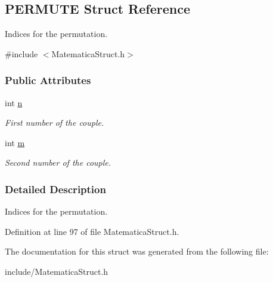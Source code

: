 \hypertarget{structPERMUTE}{}\subsection{P\+E\+R\+M\+U\+TE Struct Reference}
\label{structPERMUTE}


Indices for the permutation.  




{\ttfamily \#include $<$Matematica\+Struct.\+h$>$}

\subsubsection*{Public Attributes}
\begin{DoxyCompactItemize}
\item 
int \hyperlink{structPERMUTE_a76f11d9a0a47b94f72c2d0e77fb32240}{n}\hypertarget{structPERMUTE_a76f11d9a0a47b94f72c2d0e77fb32240}{}\label{structPERMUTE_a76f11d9a0a47b94f72c2d0e77fb32240}

\begin{DoxyCompactList}\small\item\em First number of the couple. \end{DoxyCompactList}\item 
int \hyperlink{structPERMUTE_a742204794ea328ba293fe59cec79b990}{m}\hypertarget{structPERMUTE_a742204794ea328ba293fe59cec79b990}{}\label{structPERMUTE_a742204794ea328ba293fe59cec79b990}

\begin{DoxyCompactList}\small\item\em Second number of the couple. \end{DoxyCompactList}\end{DoxyCompactItemize}


\subsubsection{Detailed Description}
Indices for the permutation. 

Definition at line 97 of file Matematica\+Struct.\+h.



The documentation for this struct was generated from the following file\+:\begin{DoxyCompactItemize}
\item 
include/Matematica\+Struct.\+h\end{DoxyCompactItemize}
